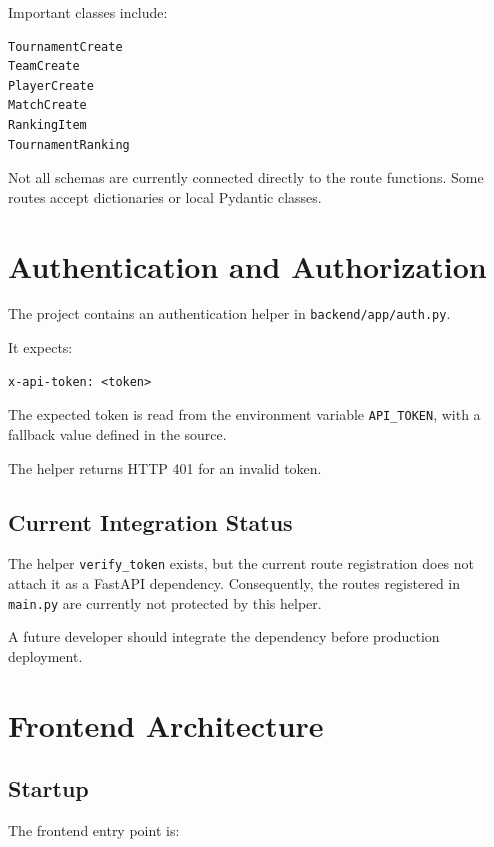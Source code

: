 \documentclass[11pt,a4paper]{article}
\begin{document}
Important classes include:

\begin{lstlisting}
TournamentCreate
TeamCreate
PlayerCreate
MatchCreate
RankingItem
TournamentRanking
\end{lstlisting}

Not all schemas are currently connected directly to the route
functions. Some routes accept dictionaries or local Pydantic classes.

\section{Authentication and Authorization}

The project contains an authentication helper in
\texttt{backend/app/auth.py}.

It expects:

\begin{lstlisting}
x-api-token: <token>
\end{lstlisting}

The expected token is read from the environment variable
\texttt{API\_TOKEN}, with a fallback value defined in the source.

The helper returns HTTP 401 for an invalid token.

\subsection{Current Integration Status}

The helper \texttt{verify\_token} exists, but the current route
registration does not attach it as a FastAPI dependency. Consequently,
the routes registered in \texttt{main.py} are currently not protected
by this helper.

A future developer should integrate the dependency before production
deployment.

\section{Frontend Architecture}

\subsection{Startup}

The frontend entry point is:
\end{document}
